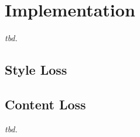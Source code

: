 
\section{Implementation}
\label{section:implementation}

\textit{tbd.}

\subsection{Style Loss}



\subsection{Content Loss}

\textit{tbd.}
